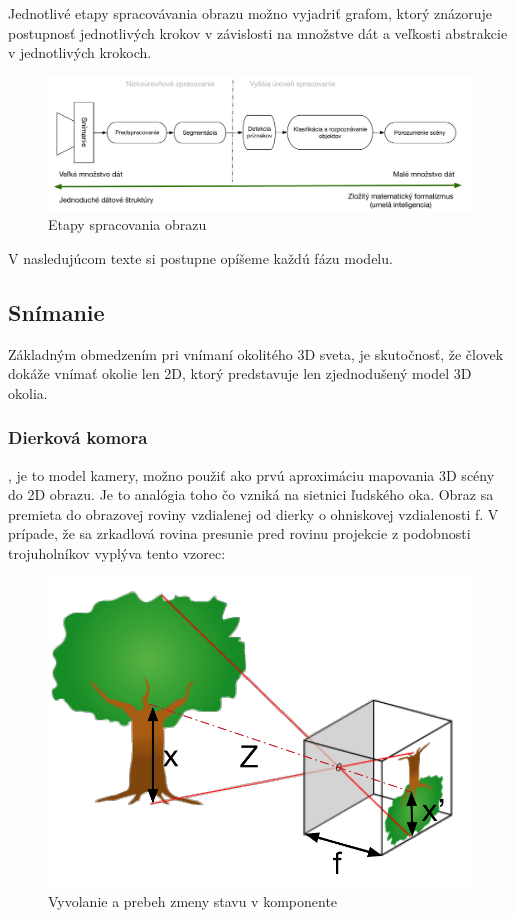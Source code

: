 Jednotlivé etapy spracovávania obrazu možno vyjadriť grafom, ktorý znázoruje postupnosť jednotlivých krokov v závislosti na množstve dát a veľkosti abstrakcie v jednotlivých krokoch. 

\begin{figure}[H]
\begin{center}
	\includegraphics[scale=0.45]{obrazky/etapy}
	\caption{Etapy spracovania obrazu}
	\end{center}
\end{figure}

V nasledujúcom texte si postupne opíšeme každú fázu modelu. 


\subsection{Snímanie}
Základným obmedzením pri vnímaní okolitého 3D sveta, je skutočnosť, že človek dokáže vnímať okolie len 2D, ktorý predstavuje len zjednodušený model 3D okolia.


\subsubsection{Dierková komora}, je to model kamery, možno použiť ako prvú aproximáciu mapovania 3D scény do 2D obrazu. Je to analógia toho čo vzniká na sietnici ľudského oka. Obraz sa premieta do obrazovej roviny vzdialenej od dierky o ohniskovej vzdialenosti f. V prípade, že sa zrkadlová rovina presunie pred rovinu projekcie z podobnosti trojuholníkov vyplýva tento vzorec:

\begin{figure}[H]
\begin{left}
	\includegraphics[scale=0.4]{obrazky/dierkovaKamera}
	\caption{Vyvolanie a prebeh zmeny stavu v komponente}
	\end{left}
\end{figure}

